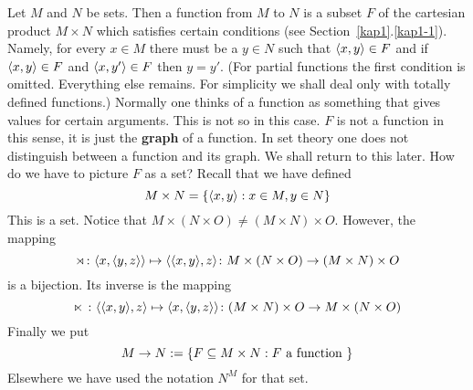 Let $M$ and $N$ be sets. Then a function from $M$ to $N$
is a subset $F$ of the cartesian product $M \times N$ which
satisfies certain conditions (see Section~\ref{kap1}.\ref{kap1-1}).
Namely, for every $x \in M$ there must be a $y \in N$
such that $\langle x, y\rangle \in F$ and if $\langle x, y\rangle \in F$
and $\langle x, y'\rangle \in F$ then $y = y'$. (For partial
functions the first condition is omitted. Everything else
remains. For simplicity we shall deal only with totally
defined functions.) Normally one thinks of a function
as something that gives values for certain arguments.
This is not so in this case. $F$ is not a function in this sense,
it is just the \textbf{graph} of a function. In set theory
one does not distinguish between a function and its graph.
We shall return to this later. How do we have to picture $F$ as
a set? Recall that we have defined
\begin{equation}
M \times N = \{\langle x,y\rangle : x\in M, y\in N\}
\end{equation}
This is a set. Notice that $M \times (N \times O) \neq
(M \times N) \times O$. 
However, the mapping %
\index{$\rtimes$, $\ltimes$}%
\begin{equation}
\rtimes \colon \langle x, \langle y, z\rangle\rangle \mapsto
\langle \langle x, y\rangle, z\rangle \colon
M \times (N\times O) \rightarrow (M\times N)\times O
\end{equation}
is a bijection. Its inverse is the mapping
\begin{equation}
\ltimes\; \colon \langle \langle x, y \rangle, z\rangle \mapsto
\langle x, \langle y, z\rangle\rangle \colon
(M \times N)\times O \rightarrow M\times (N\times O)
\end{equation}
Finally we put
\begin{equation}
M \rightarrow N := \{F \subseteq M\times N: F \mbox{ a function }\}
\end{equation}
Elsewhere we have used the notation $N^M$ for that set.
